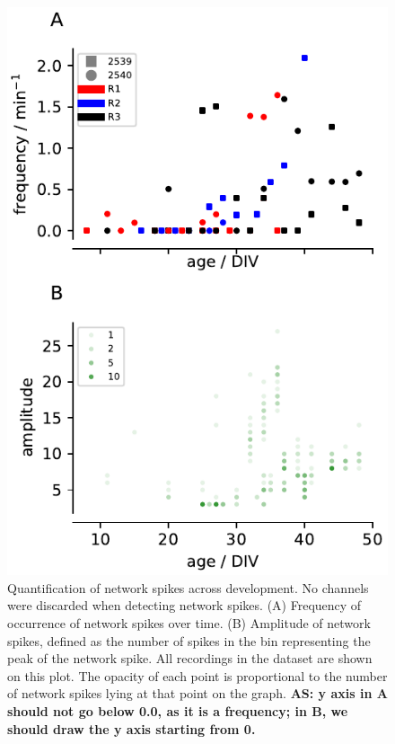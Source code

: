 \documentclass[doublespacing]{bmcart}
\begin{document}
\begin{backmatter}
\begin{figure}[h!]
    \includegraphics{../plots/network_spikes_scatter.pdf}
	\caption{Quantification of network spikes across development. No channels were discarded when detecting network spikes. (A) Frequency of occurrence of network spikes over time. (B) Amplitude of network spikes, defined as the number of spikes in the bin representing the peak of the network spike. All recordings in the dataset are shown on this plot. The opacity of each point is proportional to the number of network spikes lying at that point on the graph.  \textbf{AS: y axis in A should not go below 0.0, as it is a frequency; in B, we should draw the y axis starting from 0.}}
	\label{fig:networkfreq}
\end{figure}

\end{backmatter}
\end{document}
